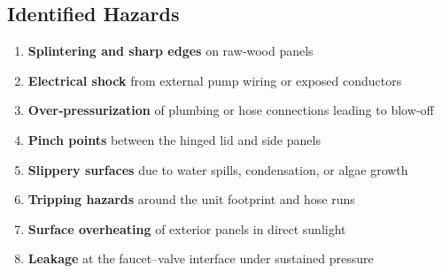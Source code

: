 \documentclass[12pt]{article}
\begin{document}
\subsection{Identified Hazards}
\begin{enumerate}[leftmargin=1.5cm]
  \item \textbf{Splintering and sharp edges} on raw‐wood panels  
  \item \textbf{Electrical shock} from external pump wiring or exposed conductors  
  \item \textbf{Over‐pressurization} of plumbing or hose connections leading to blow‐off  
  \item \textbf{Pinch points} between the hinged lid and side panels  
  \item \textbf{Slippery surfaces} due to water spills, condensation, or algae growth  
  \item \textbf{Tripping hazards} around the unit footprint and hose runs  
  \item \textbf{Surface overheating} of exterior panels in direct sunlight  
  \item \textbf{Leakage} at the faucet–valve interface under sustained pressure  
\end{enumerate}
\end{document}
